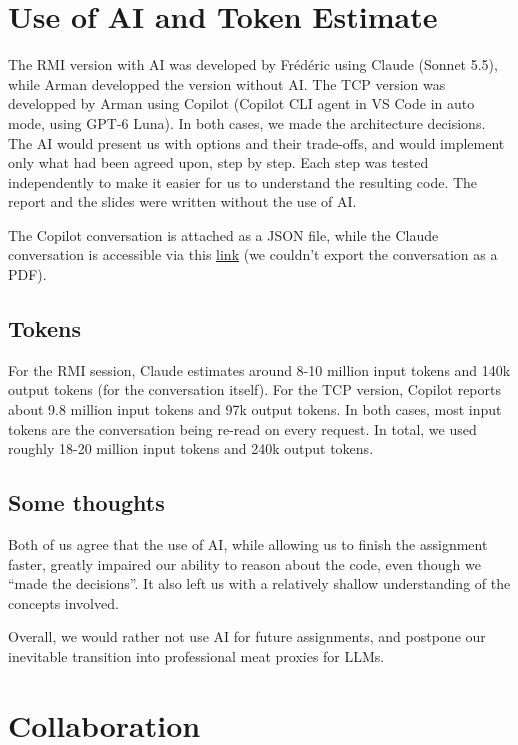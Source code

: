 \documentclass[10pt]{article}
\begin{document}
\section{Use of AI and Token Estimate}

The RMI version with AI was developed by Frédéric using Claude (Sonnet 5.5),
while Arman developped the version without AI. The TCP version was developped by
Arman using Copilot (Copilot CLI agent in VS Code in auto mode, using GPT-6
Luna). In both cases, we made the architecture decisions. The AI would present
us with options and their trade-offs, and would implement only what had been
agreed upon, step by step. Each step was tested independently to make it easier
for us to understand the resulting code. The report and the slides were written
without the use of AI.

The Copilot conversation is attached as a JSON file, while the Claude
conversation is accessible via this
\href{https://claude.ai/share/ed28011a-42ed-44b7-b5f0-b539f9a87bba}{link}
(we couldn't export the conversation as a PDF).

\subsection{Tokens}

For the RMI session, Claude estimates around 8-10 million input tokens and 140k
output tokens (for the conversation itself). For the TCP version, Copilot
reports about 9.8 million input tokens and 97k output tokens. In both cases,
most input tokens are the conversation being re-read on every request. In total,
we used roughly 18-20 million input tokens and 240k output tokens. 

\subsection{Some thoughts}

Both of us agree that the use of AI, while allowing us to finish the assignment
faster, greatly impaired our ability to reason about the code, even though we
``made the decisions''. It also left us with a relatively shallow understanding
of the concepts involved.

Overall, we would rather not use AI for future assignments, and postpone our
inevitable transition into professional meat proxies for LLMs.


\section{Collaboration}
\end{document}
